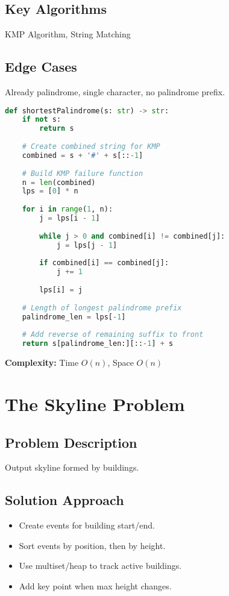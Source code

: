 \documentclass[10pt, a4paper]{article}
\begin{document}
\subsection*{Key Algorithms}
KMP Algorithm, String Matching

\subsection*{Edge Cases}
Already palindrome, single character, no palindrome prefix.

\begin{lstlisting}[language=Python]
def shortestPalindrome(s: str) -> str:
    if not s:
        return s
    
    # Create combined string for KMP
    combined = s + '#' + s[::-1]
    
    # Build KMP failure function
    n = len(combined)
    lps = [0] * n
    
    for i in range(1, n):
        j = lps[i - 1]
        
        while j > 0 and combined[i] != combined[j]:
            j = lps[j - 1]
        
        if combined[i] == combined[j]:
            j += 1
        
        lps[i] = j
    
    # Length of longest palindrome prefix
    palindrome_len = lps[-1]
    
    # Add reverse of remaining suffix to front
    return s[palindrome_len:][::-1] + s
\end{lstlisting}
\textbf{Complexity:} Time $O(n)$, Space $O(n)$

\section{The Skyline Problem}
\subsection*{Problem Description}
Output skyline formed by buildings.

\subsection*{Solution Approach}
\begin{itemize}
    \item Create events for building start/end.
    \item Sort events by position, then by height.
    \item Use multiset/heap to track active buildings.
    \item Add key point when max height changes.
\end{itemize}
\end{document}
